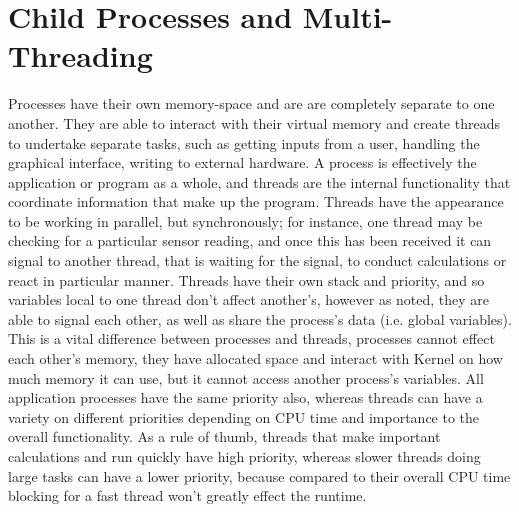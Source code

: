 \documentclass[12pt,openany,a4paper]{book}
\begin{document}
\section{Child Processes and Multi-Threading}
Processes have their own memory-space and are are completely separate to one another. They are able to interact with their virtual memory and create threads to undertake separate tasks, such as getting inputs from a user, handling the graphical interface, writing to external hardware. A process is effectively the application or program as a whole, and threads are the internal functionality that coordinate information that make up the program. Threads have the appearance to be working in parallel, but synchronously; for instance, one thread may be checking for a particular sensor reading, and once this has been received it can signal to another thread, that is waiting for the signal, to conduct calculations or react in particular manner. Threads have their own stack and priority, and so variables local to one thread don't affect another's, however as noted, they are able to signal each other, as well as share the process's data (i.e. global variables). This is a vital difference between processes and threads, processes cannot effect each other's memory, they have allocated space and interact with Kernel on how much memory it can use, but it cannot access another process's variables. All application processes have the same priority also, whereas threads can have a variety on different priorities depending on CPU time and importance to the overall functionality. As a rule of thumb, threads that make important calculations and run quickly have high priority, whereas slower threads doing large tasks can have a lower priority, because compared to their overall CPU time blocking for a fast thread won't greatly effect the runtime.\\
\end{document}
